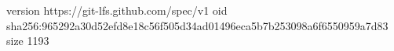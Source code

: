 version https://git-lfs.github.com/spec/v1
oid sha256:965292a30d52efd8e18c56f505d34ad01496eca5b7b253098a6f6550959a7d83
size 1193
